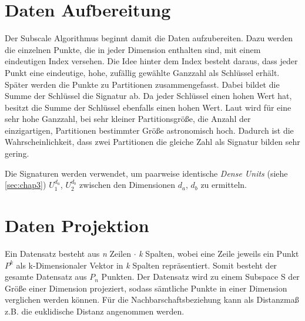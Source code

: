 \section{Daten Aufbereitung}

Der Subscale Algorithmus beginnt damit die Daten aufzubereiten. Dazu werden die einzelnen Punkte,
die in jeder Dimension enthalten sind, mit einem eindeutigen Index versehen. Die Idee hinter dem
Index besteht daraus, dass jeder Punkt eine eindeutige, hohe, zufällig gewählte Ganzzahl als
Schlüssel erhält. Später werden die Punkte zu Partitionen zusammengefasst. Dabei bildet die Summe
der Schlüssel die Signatur ab. Da jeder Schlüssel einen hohen Wert hat, besitzt die Summe der
Schlüssel ebenfalls einen hohen Wert. Laut \cite{7022654} wird für eine sehr hohe Ganzzahl, bei
sehr kleiner
Partitionsgröße, die Anzahl der einzigartigen, Partitionen bestimmter Größe astronomisch hoch.
Dadurch ist die Wahrscheinlichkeit, dass zwei Partitionen die gleiche Zahl als Signatur bilden
sehr gering.

Die Signaturen werden verwendet, um paarweise identische \emph{Dense Units} (siehe
\ref{sec:chap3}) $U_1^{d_a}$, $U_2^{d_b}$ zwischen den Dimensionen $d_a$, $d_b$ zu ermitteln.


\section{Daten Projektion}

Ein Datensatz besteht aus \emph{n} Zeilen $\cdot$ \emph{k} Spalten, wobei eine Zeile jeweils ein Punkt
$P^{k}$ als k-Dimensionaler Vektor in \emph{k} Spalten repräsentiert. Somit besteht der gesamte
Datensatz aus $P_{n}$ Punkten.
Der Datensatz wird zu einem Subspace S der Größe einer Dimension projeziert, sodass sämtliche
Punkte in einer Dimension verglichen werden können. Für die Nachbarschaftsbeziehung kann als
Distanzmaß z.B. die euklidische Distanz angenommen werden.
